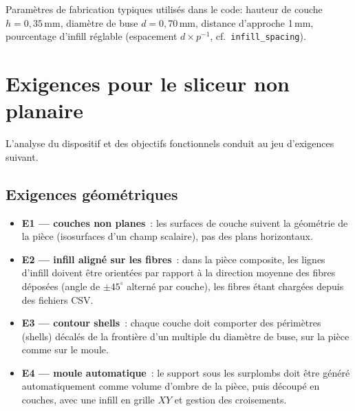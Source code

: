 \documentclass[11pt,a4paper]{article}
\begin{document}
Paramètres de fabrication typiques utilisés dans le code: hauteur de
couche $h = 0{,}35$\,mm, diamètre de buse $d = 0{,}70$\,mm, distance
d'approche 1\,mm, pourcentage d'infill réglable (espacement
$d \times p^{-1}$, cf.\ \texttt{infill\_spacing}).

\section{Exigences pour le sliceur non planaire}\label{sec:requirements}

L'analyse du dispositif et des objectifs fonctionnels conduit au jeu
d'exigences suivant.

\subsection{Exigences géométriques}
\begin{itemize}
  \item \textbf{E1 --- couches non planes}~: les surfaces de couche
        suivent la géométrie de la pièce (isosurfaces d'un champ
        scalaire), pas des plans horizontaux.
  \item \textbf{E2 --- infill aligné sur les fibres}~: dans la pièce
        composite, les lignes d'infill doivent être orientées par
        rapport à la direction moyenne des fibres déposées (angle de
        $\pm45^\circ$ alterné par couche), les fibres étant chargées
        depuis des fichiers CSV.
  \item \textbf{E3 --- contour shells}~: chaque couche doit comporter
        des périmètres (shells) décalés de la frontière d'un multiple
        du diamètre de buse, sur la pièce comme sur le moule.
  \item \textbf{E4 --- moule automatique}~: le support sous les
        surplombs doit être généré automatiquement comme volume d'ombre
        de la pièce, puis découpé en couches, avec une infill en grille
        $XY$ et gestion des croisements.
\end{itemize}
\end{document}
